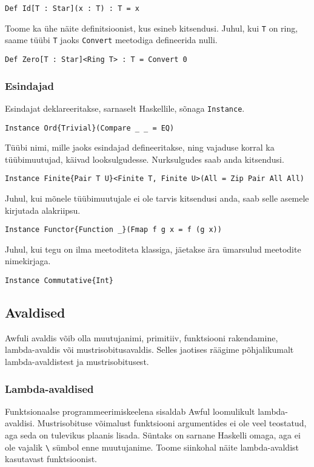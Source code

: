 \documentclass[12pt]{article}
\begin{document}
        \begin{verbatim}Def Id[T : Star](x : T) : T = x\end{verbatim}

        Toome ka ühe näite definitsioonist, kus esineb kitsendusi. Juhul, kui \verb!T! on ring, saame tüübi \verb!T! jaoks \verb!Convert! meetodiga defineerida nulli.

        \begin{verbatim}Def Zero[T : Star]<Ring T> : T = Convert 0\end{verbatim}
      \subsubsection{Esindajad}
        Esindajat deklareeritakse, sarnaselt Haskellile, sõnaga \verb!Instance!.

        \begin{verbatim}Instance Ord{Trivial}(Compare _ _ = EQ)\end{verbatim}

        Tüübi nimi, mille jaoks esindajad defineeritakse, ning vajaduse korral ka tüübimuutujad, käivad looksulgudesse. Nurksulgudes saab anda kitsendusi.

        \begin{verbatim}Instance Finite{Pair T U}<Finite T, Finite U>(All = Zip Pair All All)\end{verbatim}

        Juhul, kui mõnele tüübimuutujale ei ole tarvis kitsendusi anda, saab selle asemele kirjutada alakriipsu.

        \begin{verbatim}Instance Functor{Function _}(Fmap f g x = f (g x))\end{verbatim}

        Juhul, kui tegu on ilma meetoditeta klassiga, jäetakse ära ümarsulud meetodite nimekirjaga.

        \begin{verbatim}Instance Commutative{Int}\end{verbatim}
    \subsection{Avaldised}
      Awfuli avaldis võib olla muutujanimi, primitiiv, funktsiooni rakendamine, lambda-avaldis või mustrisobitusavaldis. Selles jaotises räägime põhjalikumalt lambda-avaldistest ja mustrisobitusest.
      \subsubsection{Lambda-avaldised}
        Funktsionaalse programmeerimiskeelena sisaldab Awful loomulikult lambda-avaldisi. Mustrisobituse võimalust funktsiooni argumentides ei ole veel teostatud, aga seda on tulevikus plaanis lisada. Süntaks on sarnane Haskelli omaga, aga ei ole vajalik \verb!\! sümbol enne muutujanime. Toome siinkohal näite lambda-avaldist kasutavast funktsioonist.
\end{document}
